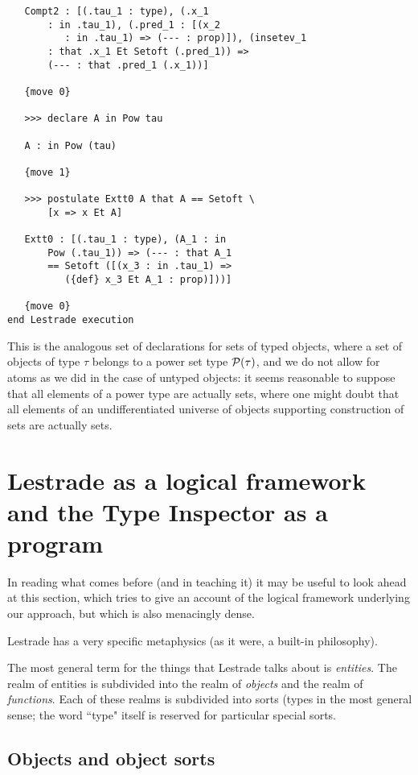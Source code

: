 \documentclass[12pt]{article}
\begin{document}
\begin{verbatim}
   Compt2 : [(.tau_1 : type), (.x_1 
       : in .tau_1), (.pred_1 : [(x_2 
          : in .tau_1) => (--- : prop)]), (insetev_1 
       : that .x_1 Et Setoft (.pred_1)) => 
       (--- : that .pred_1 (.x_1))]

   {move 0}

   >>> declare A in Pow tau

   A : in Pow (tau)

   {move 1}

   >>> postulate Extt0 A that A == Setoft \
       [x => x Et A]

   Extt0 : [(.tau_1 : type), (A_1 : in 
       Pow (.tau_1)) => (--- : that A_1 
       == Setoft ([(x_3 : in .tau_1) => 
          ({def} x_3 Et A_1 : prop)]))]

   {move 0}
end Lestrade execution

\end{verbatim}

This is the analogous set of declarations for sets of typed objects, where a set of objects of type $\tau$ belongs to a power set type ${\cal P}(\tau)$, and we do not allow for atoms as we did in the case of untyped objects:  it seems reasonable to suppose
that all elements of a power type are actually sets, where one might doubt that all elements of an undifferentiated universe of objects supporting construction of sets are actually sets.


\newpage

\section{Lestrade as a logical framework and the Type Inspector as a program}

In reading what comes before (and in teaching it) it may be useful to look ahead at this section, which tries to give an account of the logical framework underlying our approach, but which is also menacingly dense.

Lestrade has a very specific metaphysics (as it were, a built-in philosophy).

The most general term for the things that Lestrade talks about is {\em entities\/}.  The realm of entities is subdivided into the realm of {\em objects\/} and the realm of {\em functions\/}.  Each of these realms is subdivided into sorts (types in the most general sense;  the word ``type" itself is reserved for particular special sorts.

\subsection{Objects and object sorts}
\end{document}
